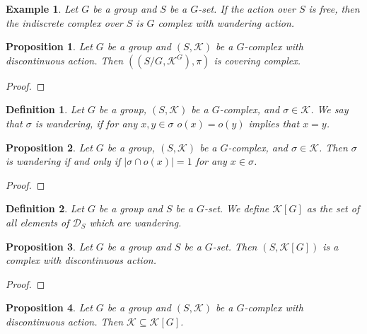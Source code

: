\documentclass{amsart}
\newtheorem{proposition}{Proposition}[section]
\newtheorem{definition}{Definition}[section]
\newtheorem{example}{Example}[section]
\begin{document}
\begin{example}
Let $G$ be a group and $S$ be a $G$-set. If the action over $S$ is free, then the indiscrete complex over $S$ is $G$ complex with wandering action.
\end{example}

\begin{proposition}
Let $G$ be a group and $(S,\mathcal{K})$ be a $G$-complex with discontinuous action. Then $((S/G,\mathcal{K}^G),\pi)$ is covering complex.
\end{proposition}

\begin{proof}

\end{proof}

\begin{definition}
Let $G$ be a group, $(S,\mathcal{K})$ be a $G$-complex, and $\sigma\in\mathcal{K}$. We say that $\sigma$ is wandering, if for any $x,y\in\sigma$ $o(x)=o(y)$ implies that $x=y$.
\end{definition}

\begin{proposition}
Let $G$ be a group, $(S,\mathcal{K})$ be a $G$-complex, and $\sigma\in\mathcal{K}$. Then $\sigma$ is wandering if and only if $\vert \sigma\cap o(x)\vert=1$ for any $x\in \sigma$.
\end{proposition}

\begin{proof}

\end{proof}

\begin{definition}
Let $G$ be a group and $S$ be a $G$-set. We define $\mathcal{K}[G]$ as the set of all elements of $\mathcal{D}_S$ which are wandering.
\end{definition}


\begin{proposition}
Let $G$ be a group and $S$ be a $G$-set. Then $(S,\mathcal{K}[G])$ is a complex  with discontinuous action.
\end{proposition}

\begin{proof}

\end{proof}

\begin{proposition}
Let $G$ be a group and $(S,\mathcal{K})$ be a $G$-complex with discontinuous action. Then $\mathcal{K}\subseteq \mathcal{K}[G]$.
\end{proposition}
\end{document}

